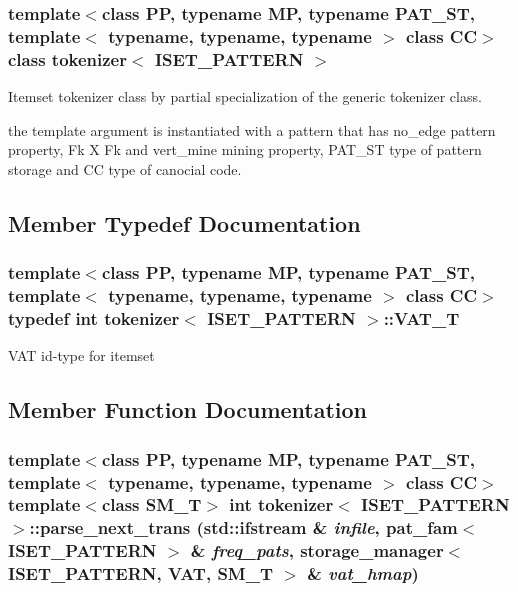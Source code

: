 \subsubsection*{template$<$class PP, typename MP, typename PAT\_\-ST, template$<$ typename, typename, typename $>$ class CC$>$ class tokenizer$<$ ISET\_\-PATTERN $>$}

Itemset tokenizer class by partial specialization of the generic tokenizer class. 

the template argument is instantiated with a pattern that has no\_\-edge pattern property, Fk X Fk and vert\_\-mine mining property, PAT\_\-ST type of pattern storage and CC type of canocial code. 



\subsection{Member Typedef Documentation}
\subsubsection{\setlength{\rightskip}{0pt plus 5cm}template$<$class PP, typename MP, typename PAT\_\-ST, template$<$ typename, typename, typename $>$ class CC$>$ typedef int {\bf tokenizer}$<$ ISET\_\-PATTERN $>$::{\bf VAT\_\-T}}\label{classtokenizer_3_01ISET__PATTERN_01_4_w4}


VAT id-type for itemset 

\subsection{Member Function Documentation}
\subsubsection{\setlength{\rightskip}{0pt plus 5cm}template$<$class PP, typename MP, typename PAT\_\-ST, template$<$ typename, typename, typename $>$ class CC$>$ template$<$class SM\_\-T$>$ int {\bf tokenizer}$<$ ISET\_\-PATTERN $>$::parse\_\-next\_\-trans (std::ifstream \& {\em infile}, {\bf pat\_\-fam}$<$ ISET\_\-PATTERN $>$ \& {\em freq\_\-pats}, {\bf storage\_\-manager}$<$ ISET\_\-PATTERN, {\bf VAT}, SM\_\-T $>$ \& {\em vat\_\-hmap})\hspace{0.3cm}{\tt  [inline]}}\label{classtokenizer_3_01ISET__PATTERN_01_4_a1}



